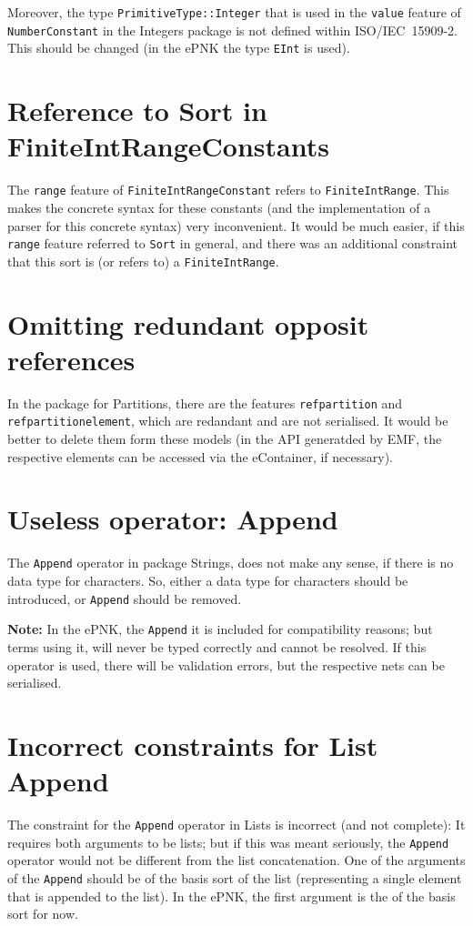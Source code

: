 Moreover, the type {\tt PrimitiveType::Integer} that is used in the {\tt value}
feature of {\tt NumberConstant} in the Integers package is not defined within
ISO/IEC~15909-2. This should be changed (in the ePNK the type  {\tt EInt} is
used).

\section{Reference to Sort in FiniteIntRangeConstants}  
The {\tt range} feature of {\tt FiniteIntRangeConstant} refers to 
{\tt FiniteIntRange}. This makes the concrete syntax for
these constants (and the implementation of a parser for this concrete syntax)
very inconvenient. It would be much easier, if this {\tt range} feature referred
to {\tt Sort} in general, and there was an additional constraint that
this sort is (or refers to) a {\tt FiniteIntRange}.

\section{Omitting redundant opposit references}
In the package for Partitions, there are the features {\tt refpartition} and
{\tt refpartitionelement}, which are redandant and are not serialised. It
would be better to delete them form these models (in the API generatded by
EMF, the respective elements can be accessed via the eContainer, if necessary).
    
\section{Useless operator: Append}    
The {\tt Append} operator in package Strings, does not make any sense, if
there is no data type for characters. So, either a data type for characters
should be introduced, or {\tt Append} should be removed. 

{\bf Note:} In the ePNK, the  {\tt Append} it is included for compatibility
reasons; but terms using it, will never be typed correctly and cannot be
resolved. If this operator is used, there will be validation errors, but the
respective nets can be serialised.
    
\section{Incorrect constraints for List Append}    
The constraint for the {\tt Append} operator in Lists is incorrect (and
not complete): It requires both arguments to be lists; but if this
was meant seriously, the {\tt Append} operator would not be different
from the list concatenation. One of the arguments of the {\tt Append}
should be of the basis sort of the list (representing a single
element that is appended to the list).  In the ePNK, the first
argument is the of the basis sort for now. 
    

